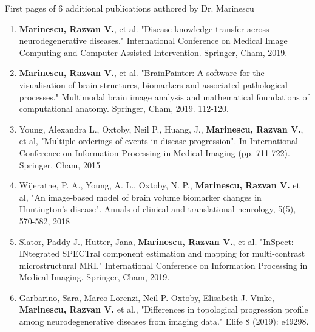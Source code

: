 \documentclass[11pt]{article}
\begin{document}
\begin{thebibliography}{9}
First pages of 6 additional publications authored by Dr. Marinescu
\begin{enumerate}
 \item \textbf{Marinescu, Razvan V.}, et al. "Disease knowledge transfer across neurodegenerative diseases." International Conference on Medical Image Computing and Computer-Assisted Intervention. Springer, Cham, 2019.
 \item \textbf{Marinescu, Razvan V.}, et al. "BrainPainter: A software for the visualisation of brain structures, biomarkers and associated pathological processes." Multimodal brain image analysis and mathematical foundations of computational anatomy. Springer, Cham, 2019. 112-120.
 \item Young, Alexandra L., Oxtoby, Neil P., Huang, J., \textbf{Marinescu, Razvan V.},  et al, "Multiple orderings of events in disease progression". In International Conference on Information Processing in Medical Imaging (pp. 711-722). Springer, Cham, 2015
 \item Wijeratne, P. A., Young, A. L., Oxtoby, N. P., \textbf{Marinescu, Razvan V.} et al, "An image‐based model of brain volume biomarker changes in Huntington's disease". Annals of clinical and translational neurology, 5(5), 570-582, 2018
 \item Slator, Paddy J., Hutter, Jana, \textbf{Marinescu, Razvan V.}, et al. "InSpect: INtegrated SPECTral component estimation and mapping for multi-contrast microstructural MRI." International Conference on Information Processing in Medical Imaging. Springer, Cham, 2019.
 \item Garbarino, Sara, Marco Lorenzi, Neil P. Oxtoby, Elisabeth J. Vinke, \textbf{Marinescu, Razvan V.} et al., "Differences in topological progression profile among neurodegenerative diseases from imaging data." Elife 8 (2019): e49298.
\end{enumerate}



\end{thebibliography}

\pagebreak





\newcommand{\ip}[1]{}
\newcommand{\ex}[2]{
\title{\textbf{\huge{Exhibit #1}}\\
\vspace{3em}
\Large{#2}
}
\author{}
\maketitle
}
\end{document}
